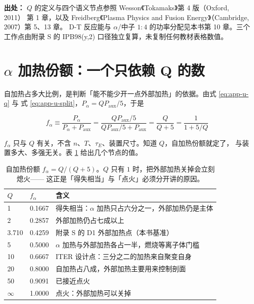 {\footnotesize
\textbf{出处：} $Q$ 的定义与四个语义节点参照 Wesson《Tokamaks》第 4 版（Oxford, 2011）
第 1 章，以及 Freidberg《Plasma Physics and Fusion Energy》（Cambridge, 2007）第 5、13 章。
D-T 反应能与 $\alpha$/中子 $1:4$ 的功率分配见本书第 10 章。三个工作点由附录 S 的
IPB98(y,2) 口径独立复算，未复制任何教材表格数值。
}

\section{\texorpdfstring{$\alpha$}{α} 加热份额：一个只依赖 Q 的数}
\label{sec:app-u-falpha}

自加热占多大比例，是判断「能不能少开一点外部加热」的依据。由式 \eqref{eq:app-u-q} 与
式 \eqref{eq:app-u-split}，$P_\alpha = QP_{\mathrm{aux}}/5$，于是

\begin{equation}
f_\alpha \equiv \frac{P_\alpha}{P_\alpha + P_{\mathrm{aux}}}
= \frac{QP_{\mathrm{aux}}/5}{QP_{\mathrm{aux}}/5 + P_{\mathrm{aux}}}
= \frac{Q}{Q+5} = \frac{1}{1+5/Q}
\label{eq:app-u-falpha}
\end{equation}

$f_\alpha$ 只与 $Q$ 有关，不含 $n$、$T$、$\tau_E$、装置尺寸。知道 $Q$，自加热份额就定了，
与装置多大、多强无关。表 \ref{tab:app-u-falpha} 给出几个节点的值。

\begin{table}[htbp]
\centering
\small
\caption{自加热份额 $f_\alpha = Q/(Q+5)$。$Q$ 只有 $1$ 时，把外部加热关掉会立刻熄火——
这正是「得失相当」与「点火」必须分开讲的原因。}
\label{tab:app-u-falpha}
\begin{tabular}{@{}p{1.6cm}p{1.8cm}p{9.0cm}@{}}
\toprule
$Q$ & $f_\alpha$ & 含义 \\
\midrule
1      & 0.1667 & 得失相当：$\alpha$ 加热只占六分之一，外部加热仍是主体 \\
2      & 0.2857 & 外部加热仍占七成以上 \\
3.710  & 0.4259 & 附录 S 的 D1 外部加热点（本书基准） \\
5      & 0.5000 & $\alpha$ 加热与外部加热各占一半，燃烧等离子体门槛 \\
10     & 0.6667 & ITER 设计点：三分之二的加热来自聚变自身 \\
20     & 0.8000 & 自加热占八成，外部加热主要用来控制剖面 \\
50     & 0.9091 & 已接近点火 \\
$\infty$ & 1.0000 & 点火：外部加热可以关掉 \\
\bottomrule
\end{tabular}

\end{table}

